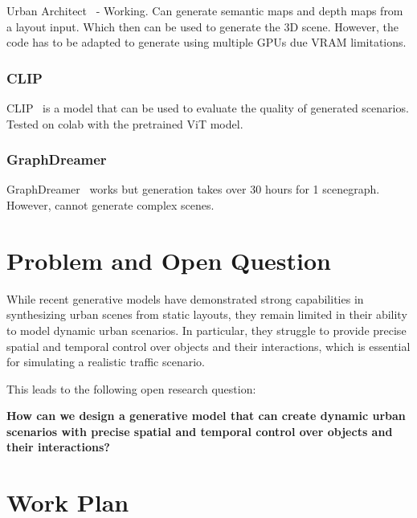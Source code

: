 \documentclass{article}
\begin{document}
Urban Architect~\cite{lu2024urban} - Working. Can generate semantic maps and depth maps from a layout input. Which then can be used to generate the 3D scene. However, the code has to be adapted to generate using multiple GPUs due VRAM limitations.

\subsubsection{CLIP}

CLIP~\cite{radford2021learning} is a model that can be used to evaluate the quality of generated scenarios. Tested on colab with the pretrained ViT model.

\subsubsection{GraphDreamer}

GraphDreamer~\cite{gao2024graphdreamer} works but generation takes over 30 hours for 1 scenegraph. However, cannot generate complex scenes.

\section{Problem and Open Question}

While recent generative models have demonstrated strong capabilities in synthesizing urban scenes from static layouts, they remain limited in their ability to model dynamic urban scenarios. In particular, they struggle to provide precise spatial and temporal control over objects and their interactions, which is essential for simulating a realistic traffic scenario.

This leads to the following open research question:

\textbf{How can we design a generative model that can create dynamic urban scenarios with precise spatial and temporal control over objects and their interactions?}

\section{Work Plan}
\end{document}
